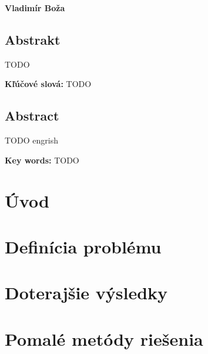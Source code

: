\documentclass[12pt,a4paper]{report}
\begin{document}
\hfill{\bf Vladimír Boža}
\eject %


\thispagestyle{empty}

\section*{Abstrakt}

TODO

\medskip
{\bf Kľúčové slová:} TODO
\eject

\thispagestyle{empty}

\section*{Abstract}

TODO engrish

\medskip
{\bf Key words:} TODO
\eject

\thispagestyle{empty}
\tableofcontents
\thispagestyle{empty}

\setcounter{page}{0}
\chapter*{Úvod}
\label{chapter:uvod}


\chapter{Definícia problému}
\label{chapter:definition}


\chapter{Doterajšie výsledky}
\label{chapter:previous}


\chapter{Pomalé metódy riešenia}
\label{chapter:slow}

\end{document}
